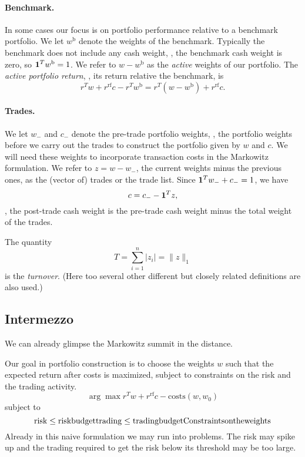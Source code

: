 \documentclass[12pt]{article}
\begin{document}
\paragraph{Benchmark.}
In some cases our focus is on portfolio performance 
relative to a benchmark portfolio.  We let $w^\mathrm{b}$ denote the weights of
the benchmark.  Typically the benchmark does not include any cash weight, \ie,
the benchmark cash weight is zero, so $\mathbf 1^T w^\mathrm{b} = 1$.
We refer to $w-w^\mathrm{b}$ as the \emph{active} weights of our portfolio.
The \emph{active portfolio return}, \ie, its return relative the benchmark, is 
\[
r^T w + r^\mathrm{rf} c - r^T w^\mathrm{b} = r^T (w-w^\mathrm{b}) + r^\mathrm{rf} c.
\]

\paragraph{Trades.}
We let $w_-$ and $c_-$ denote the pre-trade portfolio weights, \ie, the
portfolio weights before we carry out the trades to construct the portfolio
given by $w$ and $c$.
We will need these weights to incorporate transaction costs in the Markowitz formulation.
We refer to $z=w-w_-$, the current weights minus the previous ones,
as the (vector of) trades or the trade list.  Since $\mathbf 1^T w_- + c_-=1$, we have 
\[
c = c_- - \mathbf 1^T z,
\]
\ie, the post-trade cash weight is the pre-trade cash weight minus the total
weight of the trades.

The quantity
\[
T = \sum_{i=1}^n |z_i| = \| z\|_1
\]
is the \emph{turnover}.  (Here too several other different but closely related 
definitions are also used.)

\subsection*{Intermezzo}
We can already glimpse the Markowitz summit in the distance.

Our goal in portfolio construction is to choose the weights $w$ such that the
expected return after costs is maximized,
subject to constraints on the risk and the trading activity.
\[
\arg \max r^T w + r^\mathrm{rf} c - \mathrm{costs}(w, w_0)
\]
subject to
\[
    \mathrm{risk} \leq \mathrm{risk budget} \\
    \mathrm{trading} \leq \mathrm{trading budget} \\
    \mathrm{Constraints on the weights}
\]
Already in this naive formulation we may run into problems.
The risk may spike up and the trading required to get the risk below its threshold
may be too large.
\end{document}
